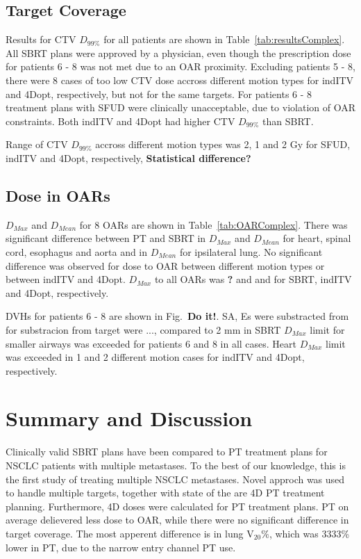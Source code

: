\documentclass[type=dr, dr=rernat, accentcolor=tud7b,colorbacktitle, bigchapter, openright, twoside, 12pt ]{tudthesis}
\begin{document}
\subsection{Target Coverage}

Results for CTV $D_{99\%}$ for all patients are shown in Table~\ref{tab:resultsComplex}. All SBRT plans were approved by a physician, 
even though the prescription dose for patients 6 - 8 was not met due to an OAR proximity. Excluding patients 5 - 8, there were 8  cases of too low CTV dose accross different
motion types for indITV and 4Dopt, respectively, but not for the same targets.
For patients 6 - 8 treatment plans with SFUD were clinically unacceptable, due to violation of OAR constraints. Both indITV and 4Dopt had higher CTV $D_{99\%}$ than SBRT.

Range of CTV $D_{99\%}$ accross different motion types was 2, 1 and 2 Gy for SFUD, indITV and 4Dopt, respectively, \textbf{Statistical difference?}



\subsection{Dose in OARs}

$D_{Max}$ and $D_{Mean}$ for 8 OARs are shown in Table~\ref{tab:OARComplex}. There was significant difference between PT and SBRT in $D_{Max}$ and $D_{Mean}$ for heart, spinal cord, esophagus and aorta and in $D_{Mean}$ for ipsilateral lung.
No significant difference was observed for dose to OAR between different motion types or between indITV and 4Dopt. $D_{Max}$ to all OARs was \textbf{?} and and for SBRT, indITV and 4Dopt, respectively.

DVHs for patients 6 - 8 are shown in Fig.~\textbf{Do it!}. SA, Es were substracted from for substracion from target were ..., compared to 2 mm in SBRT
$D_{Max}$ limit for smaller airways was exceeded for patients 6 and 8 in all cases. Heart $D_{Max}$ limit was exceeded in 1 and 2 different motion cases for indITV and 4Dopt, respectively.





\section{Summary and Discussion}

Clinically valid SBRT plans have been compared to PT treatment plans for NSCLC patients with multiple metastases. To the best of our knowledge, this is the first study of treating multiple NSCLC metastases. Novel approch was used to handle multiple targets, together
with state of the are 4D PT treatment planning. Furthermore, 4D doses were calculated for PT treatment plans. PT on average delievered less dose to OAR, while there were no
significant difference in target coverage. The most apperent difference is in lung V${_20\%}$, which was 3333\% lower in PT, due to the narrow entry channel PT use.
\end{document}
